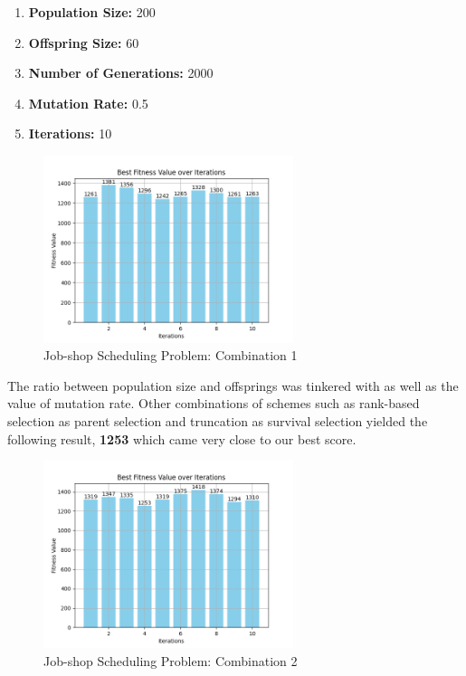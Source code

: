 \documentclass[12pt]{article}
\begin{document}
\begin{enumerate}
    \item \textbf{Population Size:} 200
    \item \textbf{Offspring Size:} 60
    \item \textbf{Number of Generations:} 2000
    \item \textbf{Mutation Rate:} 0.5
    \item \textbf{Iterations:} 10
\end{enumerate}

\begin{figure}[h]
    \centering
    \includegraphics[width=0.65\textwidth]{images/Figure_2.png}
    \caption{Job-shop Scheduling Problem: Combination 1}
\end{figure}

The ratio between population size and offsprings was tinkered with as well as the value of mutation rate. 
Other combinations of schemes such as rank-based selection as parent selection and truncation as survival selection yielded the following result, \textbf{1253} which came very close to our best score. 

\begin{figure}[h]
    \centering
    \includegraphics[width=0.65\textwidth]{images/JSSP_rbstr150-40-2000-0.5-10.png}
    \caption{Job-shop Scheduling Problem: Combination 2}
\end{figure}
\end{document}
